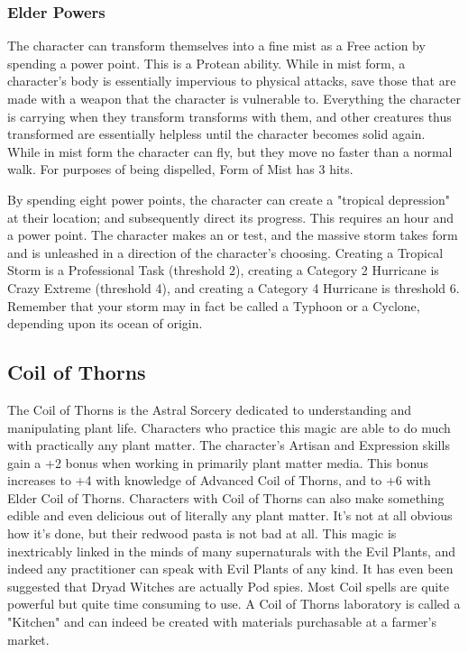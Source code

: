 \subsubsection{Elder Powers}

 The character can transform themselves into a fine mist as a Free action by spending a power point. This is a Protean ability. While in mist form, a character's body is essentially impervious to physical attacks, save those that are made with a weapon that the character is vulnerable to. Everything the character is carrying when they transform transforms with them, and other creatures thus transformed are essentially helpless until the character becomes solid again. While in mist form the character can fly, but they move no faster than a normal walk. For purposes of being dispelled, Form of Mist has 3 hits.

 By spending eight power points, the character can create a "tropical depression" at their location; and subsequently direct its progress. This requires an hour and a power point. The character makes an  or  test, and the massive storm takes form and is unleashed in a direction of the character's choosing. Creating a Tropical Storm is a Professional Task (threshold 2), creating a Category 2 Hurricane is Crazy Extreme (threshold 4), and creating a Category 4 Hurricane is threshold 6. Remember that your storm may in fact be called a Typhoon or a Cyclone, depending upon its ocean of origin.


\subsection{Coil of Thorns}

The Coil of Thorns is the Astral Sorcery dedicated to understanding and manipulating plant life. Characters who practice this magic are able to do much with practically any plant matter. The character's Artisan and Expression skills gain a +2 bonus when working in primarily plant matter media. This bonus increases to +4 with knowledge of Advanced Coil of Thorns, and to +6 with Elder Coil of Thorns. Characters with Coil of Thorns can also make something edible and even delicious out of literally any plant matter. It's not at all obvious how it's done, but their redwood pasta is not bad at all. This magic is inextricably linked in the minds of many supernaturals with the Evil Plants, and indeed any practitioner can speak with Evil Plants of any kind. It has even been suggested that Dryad Witches are actually Pod spies. Most Coil spells are quite powerful but quite time consuming to use. A Coil of Thorns laboratory is called a "Kitchen" and can indeed be created with materials purchasable at a farmer's market.


